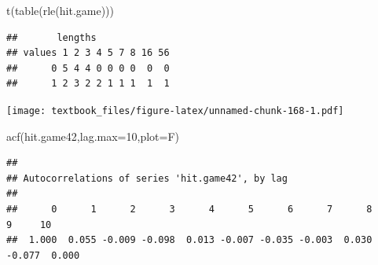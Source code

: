 \documentclass[
  11pt,
]{book}
\newenvironment{Shaded}{\begin{snugshade}}{\end{snugshade}}
\newcommand{\AttributeTok}[1]{\textcolor[rgb]{0.77,0.63,0.00}{#1}}
\newcommand{\CommentTok}[1]{\textcolor[rgb]{0.56,0.35,0.01}{\textit{#1}}}
\newcommand{\DecValTok}[1]{\textcolor[rgb]{0.00,0.00,0.81}{#1}}
\newcommand{\FunctionTok}[1]{\textcolor[rgb]{0.00,0.00,0.00}{#1}}
\newcommand{\NormalTok}[1]{#1}
\newcommand{\OtherTok}[1]{\textcolor[rgb]{0.56,0.35,0.01}{#1}}
\newcommand{\SpecialCharTok}[1]{\textcolor[rgb]{0.00,0.00,0.00}{#1}}
\newcommand{\StringTok}[1]{\textcolor[rgb]{0.31,0.60,0.02}{#1}}
\theoremstyle{definition}
\theoremstyle{definition}
\theoremstyle{definition}
\theoremstyle{definition}
\theoremstyle{remark}
\begin{document}
\begin{Shaded}
\begin{Highlighting}[]
\FunctionTok{t}\NormalTok{(}\FunctionTok{table}\NormalTok{(}\FunctionTok{rle}\NormalTok{(hit.game)))}
\end{Highlighting}
\end{Shaded}

\begin{verbatim}
##       lengths
## values 1 2 3 4 5 7 8 16 56
##      0 5 4 4 0 0 0 0  0  0
##      1 2 3 2 2 1 1 1  1  1
\end{verbatim}

\newpage

\begin{Shaded}
\end{Shaded}

\texttt{[image: textbook\_files/figure-latex/unnamed-chunk-168-1.pdf]}

\begin{Shaded}
\begin{Highlighting}[]
\FunctionTok{acf}\NormalTok{(hit.game42,}\AttributeTok{lag.max=}\DecValTok{10}\NormalTok{,}\AttributeTok{plot=}\NormalTok{F)}
\end{Highlighting}
\end{Shaded}

\begin{verbatim}
## 
## Autocorrelations of series 'hit.game42', by lag
## 
##      0      1      2      3      4      5      6      7      8      9     10 
##  1.000  0.055 -0.009 -0.098  0.013 -0.007 -0.035 -0.003  0.030 -0.077  0.000
\end{verbatim}
\end{document}
